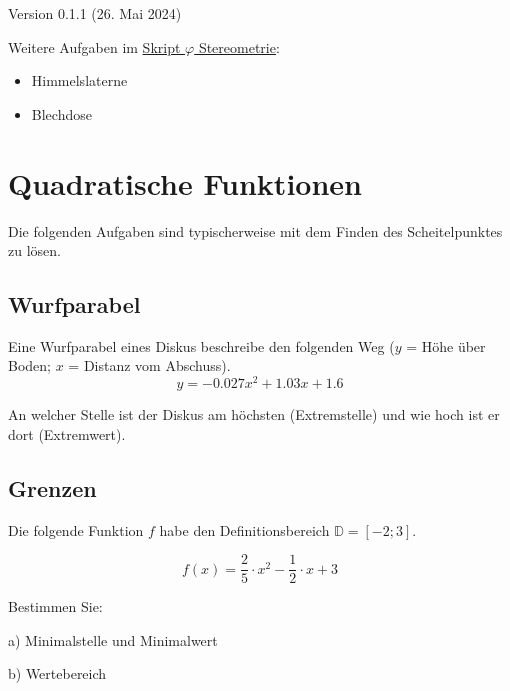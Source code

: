 


\renewcommand{\metaHeaderLine}{Extremwertaufgaben}
\renewcommand{\arbeitsblattTitel}{Extremwertaufgaben}


\arbeitsblattHeader{}

\begin{center}Version 0.1.1 (26. Mai 2024) \end{center}

Weitere Aufgaben im \href{https://olat.bbw.ch/auth/RepositoryEntry/572162090/CourseNode/109695301829998}{Skript $\varphi$ Stereometrie}:

\begin{itemize}
\item Himmelslaterne
\item Blechdose
\end{itemize}

\newpage

\section{Quadratische Funktionen}
Die folgenden Aufgaben sind typischerweise mit dem Finden des
Scheitelpunktes zu lösen.

\subsection{Wurfparabel}
Eine Wurfparabel eines Diskus beschreibe den folgenden Weg ($y$ = Höhe über Boden;
$x$ = Distanz vom Abschuss).
$$y =-0.027 x^2 + 1.03x + 1.6$$

An welcher Stelle ist der Diskus am höchsten (Extremstelle) und wie
hoch ist er dort (Extremwert).

\subsection{Grenzen}
Die folgende Funktion $f$ habe den Definitionsbereich
$\mathbb{D}=[-2;3]$.

$$f(x) = \frac25\cdot{}x^2 - \frac12\cdot{}x + 3$$

Bestimmen Sie:

a) Minimalstelle und Minimalwert

b) Wertebereich

